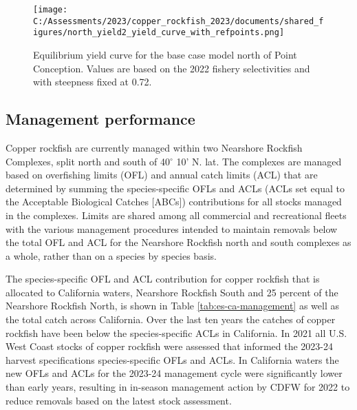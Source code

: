 \documentclass[11pt,
  english,
  letterpaper,
]{article}
\begin{document}
\begin{figure}
\centering
\texttt{[image: C:/Assessments/2023/copper\_rockfish\_2023/documents/shared\_figures/north\_yield2\_yield\_curve\_with\_refpoints.png]}
\caption{Equilibrium yield curve for the base case model north of Point Conception. Values are based on the 2022 fishery selectivities and with steepness fixed at 0.72.\label{fig:north-es-yield}}
\end{figure}

\pagebreak

\hypertarget{management-performance}{%
\subsection*{Management performance}\label{management-performance}}

Copper rockfish are currently managed within two Nearshore Rockfish Complexes, split north and south of 40\(^\circ\) 10' N. lat. The complexes are managed based on overfishing limits (OFL) and annual catch limits (ACL) that are determined by summing the species-specific OFLs and ACLs (ACLs set equal to the Acceptable Biological Catches {[}ABCs{]}) contributions for all stocks managed in the complexes. Limits are shared among all commercial and recreational fleets with the various management procedures intended to maintain removals below the total OFL and ACL for the Nearshore Rockfish north and south complexes as a whole, rather than on a species by species basis.

The species-specific OFL and ACL contribution for copper rockfish that is allocated to California waters, Nearshore Rockfish South and 25 percent of the Nearshore Rockfish North, is shown in Table \ref{tab:es-ca-management} as well as the total catch across California. Over the last ten years the catches of copper rockfish have been below the species-specific ACLs in California. In 2021 all U.S. West Coast stocks of copper rockfish were assessed that informed the 2023-24 harvest specifications species-specific OFLs and ACLs. In California waters the new OFLs and ACLs for the 2023-24 management cycle were significantly lower than early years, resulting in in-season management action by CDFW for 2022 to reduce removals based on the latest stock assessment.

\begingroup\fontsize{10}{12}\selectfont
\begingroup\fontsize{10}{12}\selectfont
\end{document}
